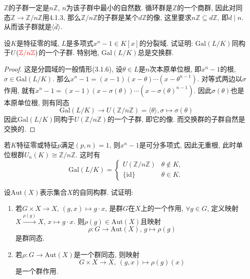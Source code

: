 \documentclass{../solutions-cn}
\begin{document}
\begin{remark}
    $\mathbb{Z}$的子群一定是$n\mathbb{Z}$, $n$为该子群中最小的自然数. 循环群是$\mathbb{Z}$的一个商群, 因此对同态$\mathbb{Z} \to \mathbb{Z}/n\mathbb{Z}$用4.1.3, 那么$\mathbb{Z}/n\mathbb{Z}$的子群是某个$d\mathbb{Z}$的像, 这里要求$n\mathbb{Z} \subseteq d\mathbb{Z}$, 即$d \mid n$. 从而该子群就是$\langle \overline{d} \rangle$.
\end{remark}

\begin{exercise}[习题4.3.3]
    设$K$是特征零的域, $L$是多项式$x^n - 1 \in K[x]$的分裂域. 试证明: $\mathrm{Gal}(L/K)$同构于$U(\textcolor{red}{\mathbb{Z}/n\mathbb{Z}})$的一个子群. 特别地, $\mathrm{Gal}(L/K)$总是交换群.
\end{exercise}

\begin{proof}
    这是分圆域的一般情形(3.1.6), 设$\theta \in L$是$n$次本原单位根, 即$x^n - 1$的根, $\sigma \in \mathrm{Gal}(L/K)$. 那么$x^n - 1 = (x - 1)(x - \theta) \cdots (x - \theta^{n - 1})$. 对等式两边以$\sigma$作用, 就有$x^n - 1 = (x - 1)(x - \sigma(\theta)) \cdots (x - \sigma(\theta)^{n - 1})$. 因此$\sigma(\theta)$也是本原单位根, 则有同态
    \[
        \mathrm{Gal}(L/K) \to U(\mathbb{Z}/n\mathbb{Z}) = \langle \theta \rangle, \sigma \mapsto \sigma(\theta)
    \]
    因此$\mathrm{Gal}(L/K)$同构于$U(\mathbb{Z}/n\mathbb{Z})$的一个子群, 即它的像. 而交换群的子群自然是交换的.
\end{proof}

\begin{remark}
    若$K$特征零或特征$p$满足$(p, n) = 1$, 则$x^n - 1$是可分多项式, 因此无重根, 此时单位根群$U_n(K) \cong \mathbb{Z}/n\mathbb{Z}$. 这时有
    \[
        \mathrm{Gal}(L/K) =
        \begin{cases}
            U(\mathbb{Z}/n\mathbb{Z}) & \theta \notin K,\\
            \{\mathrm{id}\} & \theta \in K.
        \end{cases} 
    \]
\end{remark}

\begin{exercise}[习题4.5.1]
    设$\mathrm{Aut}(X)$表示集合$X$的自同构群. 试证明: 
    \begin{enumerate}[(1)]
        \item 若$G \times X \to X,\, (g, x) \mapsto g \cdot x$, 是群$G$在$X$上的一个作用, $\forall g \in G$, 定义映射$X \xrightarrow{\rho(g)} X$, $x \mapsto g \cdot x$. 则$\rho(g) \in \mathrm{Aut}(X)$且映射
        \[
            \rho:G \to \mathrm{Aut}(X),\, g \mapsto \rho(g)
        \]
        是群同态.
        \item 若$\rho:G \to \mathrm{Aut}(X)$是一个群同态, 则映射
        \[
            G \times X \to X,\: (g, x) \mapsto \rho(g)(x)
        \]
        是一个群作用.
    \end{enumerate}
\end{exercise}
\end{document}
